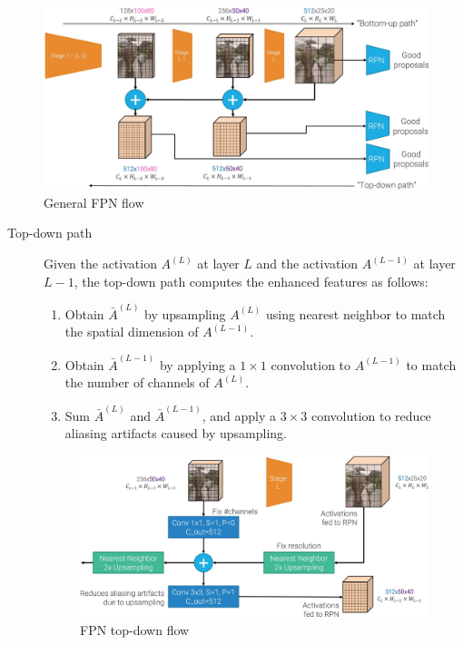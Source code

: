 \begin{description}
        \begin{figure}[H]
            \centering
            \includegraphics[width=0.7\linewidth]{./img/_fpn_flow.jpg}
            \caption{General FPN flow}
        \end{figure}

        \begin{description}
            \item[Top-down path] 
                Given the activation $A^{(L)}$ at layer $L$ and the activation $A^{(L-1)}$ at layer $L-1$, the top-down path computes the enhanced features as follows:
                \begin{enumerate}
                    \item Obtain $\bar{A}^{(L)}$ by upsampling $A^{(L)}$ using nearest neighbor to match the spatial dimension of $A^{(L-1)}$.
                    \item Obtain $\bar{A}^{(L-1)}$ by applying a $1 \times 1$ convolution to $A^{(L-1)}$ to match the number of channels of $A^{(L)}$.
                    \item Sum $\bar{A}^{(L)}$ and $\bar{A}^{(L-1)}$, and apply a $3 \times 3$ convolution to reduce aliasing artifacts caused by upsampling.
                \end{enumerate}

                \begin{figure}[H]
                    \centering
                    \includegraphics[width=0.65\linewidth]{./img/_fpn_top_down.jpg}
                    \caption{FPN top-down flow}
                \end{figure}
        \end{description}


\end{description}
